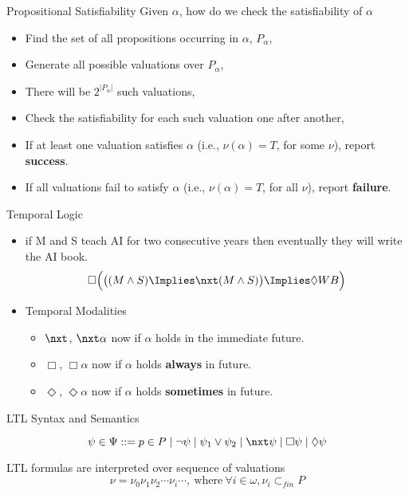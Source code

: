 \documentclass[xcolor=dvipsnames]{beamer}
\begin{document}
\begin{frame}{Propositional Satisfiability}
Given $\alpha$, how do we check the satisfiability of $\alpha$
\begin{itemize}
\item Find the set of all propositions occurring in $\alpha$, $P_{\alpha}$,
\item Generate all possible valuations over $P_{\alpha}$,
\item There will be $2^{|P_{\alpha}|}$ such valuations,
\item Check the satisfiability for each such valuation one after another,
\item If at least one valuation satisfies $\alpha$ (i.e., $\nu(\alpha)=T$, for some $\nu$), \newline report {\bf success}.
\item If all valuations fail to satisfy $\alpha$ (i.e., $\nu(\alpha)=T$, for all $\nu$), \newline report {\bf failure}.
\end{itemize}
\end{frame}
%
%
\begin{frame}{Temporal Logic}
\begin{itemize}
\item if M and S teach AI for two consecutive years then eventually they will write the AI book.
\[\Box \Big(\big((M \land S)\Implies \nxt (M \land S) \big)\Implies \Diamond WB \Big)\]
\pause
\item Temporal Modalities
\begin{itemize}
\item $\nxt$, $\nxt \alpha$ now if $\alpha$ holds in the immediate future.
\item $\Box$, $\Box \alpha$ now if $\alpha$ holds {\bf always} in future.
\item $\Diamond$, $\Diamond \alpha$ now if $\alpha$ holds {\bf sometimes} in future. 
\end{itemize}
\end{itemize}
\end{frame}
%
\begin{frame}{LTL Syntax and Semantics}

\[\psi \in \Psi ::= p \in P \mid  \lnot \psi \mid \psi_1\lor\psi_2 \mid \nxt \psi \mid \Box \psi \mid \Diamond \psi\]

LTL formulas are interpreted over sequence of valuations 
\[\nu=\nu_0\nu_1\nu_2\cdots\nu_i\cdots, ~\mbox{where}~ \forall i \in \omega, \nu_i \subset_{fin} P\] 
\end{frame}
\end{document}
